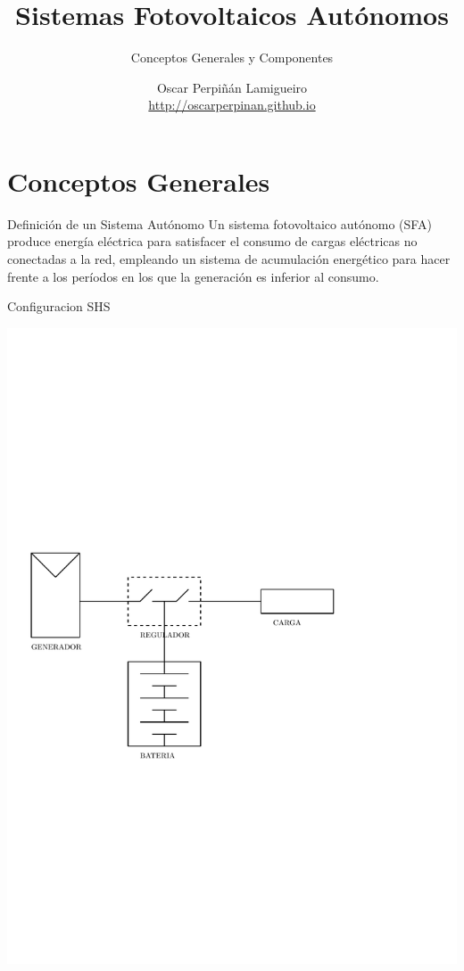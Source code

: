 \documentclass[xcolor={usenames,svgnames,dvipsnames}]{beamer}
\author{Oscar Perpiñán Lamigueiro \\ \url{http://oscarperpinan.github.io}}
\date{}
\title{Sistemas Fotovoltaicos Autónomos}
\subtitle{Conceptos Generales y Componentes}
\begin{document}
\maketitle

\section{Conceptos Generales}
\label{sec:org8652583}

\begin{frame}[label={sec:orgb9ba6fa}]{Definición de un Sistema Autónomo}
Un sistema fotovoltaico autónomo (SFA) produce energía eléctrica para \alert{satisfacer el consumo de cargas eléctricas no conectadas a la red}, \alert{empleando un sistema de acumulación energético} para hacer frente a los períodos en los que la generación es inferior al consumo.
\end{frame}

\begin{frame}[label={sec:org5f8920e}]{Configuracion SHS}
\begin{center}
\includegraphics[width=.9\linewidth]{../figs/DiagramaUnifilarER_DC.pdf}
\end{center}
\end{frame}
\end{document}
